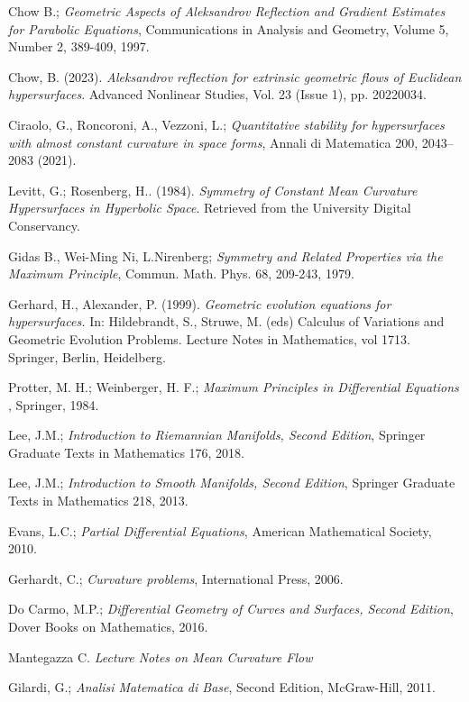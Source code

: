 \documentclass[a4paper, 12pt]{book}
\begin{document}
{}
\begin{thebibliography}{11} 
	 Chow B.; {\em Geometric Aspects of Aleksandrov Reflection and Gradient Estimates for Parabolic Equations}, Communications in Analysis and Geometry, Volume 5, Number 2, 389-409, 1997.
	
	 Chow, B. (2023). {\em Aleksandrov reflection for extrinsic geometric flows of Euclidean hypersurfaces}. Advanced Nonlinear Studies, Vol. 23 (Issue 1), pp. 20220034.
	
	 Ciraolo, G., Roncoroni, A., Vezzoni, L.;  {\em Quantitative stability for hypersurfaces with almost constant curvature in space forms}, Annali di Matematica 200, 2043–2083 (2021).
	
	Levitt, G.; Rosenberg, H.. (1984). {\em Symmetry of Constant Mean Curvature Hypersurfaces in Hyperbolic Space}. Retrieved from the University Digital Conservancy.%
	
	 Gidas B., Wei-Ming Ni, L.Nirenberg; {\em Symmetry and Related Properties via the Maximum Principle},  Commun. Math. Phys. 68, 209-243, 1979. 
	
	 Gerhard, H., Alexander, P. (1999). {\em Geometric evolution equations for hypersurfaces.} In: Hildebrandt, S., Struwe, M. (eds) Calculus of Variations and Geometric Evolution Problems. Lecture Notes in Mathematics, vol 1713. Springer, Berlin, Heidelberg.
	
	
	  Protter, M. H.;  Weinberger, H. F.; {\em Maximum Principles in Differential Equations },  Springer, 1984. 
	
	
	 Lee, J.M.; {\em Introduction to Riemannian Manifolds, Second Edition},  Springer Graduate Texts in Mathematics 176, 2018. 
	
	 Lee, J.M.; {\em Introduction to Smooth Manifolds, Second Edition},  Springer Graduate Texts in Mathematics 218, 2013. 
	
	 Evans, L.C.; {\em Partial Differential Equations},  American Mathematical Society, 2010. 
	
	 Gerhardt, C.; {\em Curvature problems}, International Press, 2006.
	
	 Do Carmo, M.P.; {\em Differential Geometry of Curves and Surfaces, Second Edition},  Dover Books on Mathematics, 2016. 
	
	
	 Mantegazza C. {\em Lecture Notes on Mean Curvature Flow}
	
	
	 Gilardi, G.; {\em Analisi Matematica di Base},  Second Edition,  McGraw-Hill, 2011. 
\end{thebibliography}
%
\end{document}
